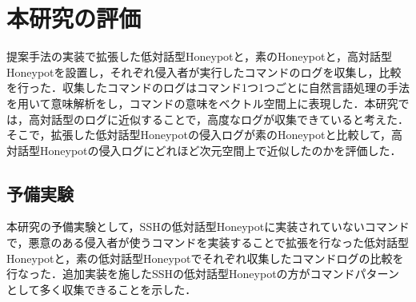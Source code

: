 \section{本研究の評価}
\label{intr:eval}
提案手法の実装で拡張した低対話型Honeypotと，素のHoneypotと，高対話型Honeypotを設置し，それぞれ侵入者が実行したコマンドのログを収集し，比較を行った．収集したコマンドのログはコマンド1つ1つごとに自然言語処理の手法を用いて意味解析をし，コマンドの意味をベクトル空間上に表現した．本研究では，高対話型のログに近似することで，高度なログが収集できていると考えた．そこで，拡張した低対話型Honeypotの侵入ログが素のHoneypotと比較して，高対話型Honeypotの侵入ログにどれほど次元空間上で近似したのかを評価した．

\subsection{予備実験}
\label{intr:prex}
本研究の予備実験として，SSHの低対話型Honeypotに実装されていないコマンドで，悪意のある侵入者が使うコマンドを実装することで拡張を行なった低対話型Honeypotと，素の低対話型Honeypotでそれぞれ収集したコマンドログの比較を行なった．追加実装を施したSSHの低対話型Honeypotの方がコマンドパターンとして多く収集できることを示した．







